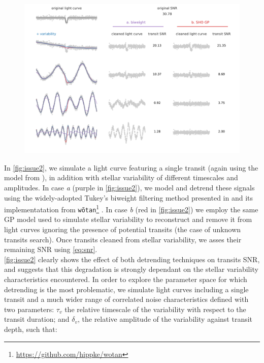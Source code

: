 \documentclass{aastex631}
\begin{document}
\begin{figure}[H]
    \begin{centering}
        \includegraphics[width=\linewidth]{../figures/issue2.pdf}
        \caption{}
        \label{fig:issue2}
    \end{centering}
\end{figure}

In \autoref{fig:issue2}, we simulate a light curve featuring a single transit (again using the model from \citealt{protopapas}), in addition with stellar variability of different timescales and amplitudes. In case \textit{a} (purple in \autoref{fig:issue2}), we model and detrend these signals using the widely-adopted Tukey's biweight filtering method presented in \citealt{tukey} and its implementatation from \texttt{wõtan}\footnote{\href{https://github.com/hippke/wotan}{https://github.com/hippke/wotan}} \citep{wotan}. In case \textit{b} (red in \autoref{fig:issue2}) we employ the same GP model used to simulate stellar variability to reconstruct and remove it from light curves ignoring the presence of potential transits (the case of unknown transits search). Once transits cleaned from stellar variability, we asses their remaining SNR using \autoref{eq:snr}.\\

\autoref{fig:issue2} clearly shows the effect of both detrending techniques on transits SNR, and suggests that this degradation is strongly dependant on the stellar variability characteristics encountered. In order to explore the parameter space for which detrending is the most problematic, we simulate light curves including a single transit and a much wider range of correlated noise characteristics defined with two parameters: $\tau_v$ the relative timescale of the variability with respect to the transit duration; and $\delta_v$, the relative amplitude of the variability against transit depth, such that:
\end{document}
